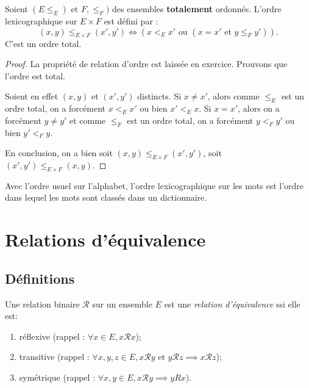\begin{propdef}
Soient $(E\leq_E)$ et $F,\leq_F)$ des ensembles \textbf{totalement} ordonnés.
L'ordre lexicographique sur $E\times F$ est défini par :
\[
(x,y) \leq_{E\times F} (x',y') \iff \left(x<_E x' \text{ ou } (x=x' \text{ et } y\leq_F y')\right).
\]
C'est un ordre total.
\end{propdef}
\begin{proof}
La propriété de relation d'ordre est laissée en exercice. Prouvons que l'ordre est total.

Soient en effet $(x,y)$ et $(x',y')$ distincts.
Si $x\neq x'$, alors comme $\leq_E$ est un ordre total, on a forcément $x<_E x'$ ou bien $x'<_E x$.
Si $x=x'$, alors on a forcément $y\neq y'$ et comme $\leq_F$ est un ordre total, on a forcément $y <_F y'$ ou bien $y'<_F y$.

En conclusion, on a bien soit $(x,y) \leq_{E\times F} (x',y')$, soit  $(x',y') \leq_{E\times F} (x,y)$.
\end{proof}

\begin{exemple}
Avec l'ordre usuel sur l'alphabet, l'ordre lexicographique sur les mots est l'ordre dans lequel les mots sont classés dans un dictionnaire.
\end{exemple}








\section{Relations d'équivalence}

\subsection{Définitions}

\begin{definition}
Une relation binaire ${\mathcal R}$ sur un ensemble $E$ est une \emph{relation d'équivalence} ssi elle est:
\begin{enumerate}
\item réflexive (rappel : $\forall x\in E, x{\mathcal R}x$);
\item transitive (rappel : $\forall x, y, z\in E, x{\mathcal R}y\text{ et } y{\mathcal R}z \implies x{\mathcal R}z$);
\item symétrique (rappel : $\forall x, y\in E, x{\mathcal R}y \implies yRx$).
\end{enumerate}
\end{definition}

